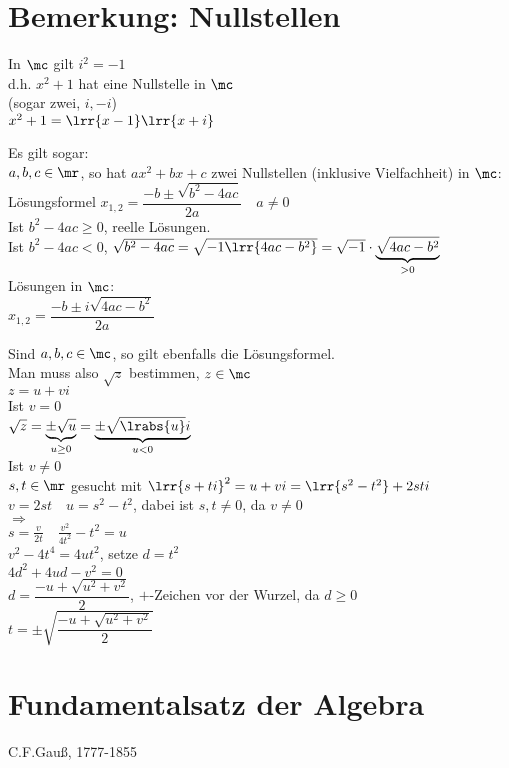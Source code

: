 \section{Bemerkung: Nullstellen}
		\item In $\mc$ gilt $i^2=-1$\\
			d.h. $x^2+1$ hat eine Nullstelle in $\mc$\\
			(sogar zwei, $i,-i$)\\
			$x^2+1=\lrr{x-1}\lrr{x+i}$

			Es gilt sogar:\\
			$a,b,c\in\mr$, so hat $ax^2+bx+c$ zwei Nullstellen (inklusive Vielfachheit) in $\mc$:\\
			Lösungsformel $x_{1,2}=\dfrac{-b\pm\sqrt{b^2-4ac}}{2a}\quad a\neq 0$\\
			Ist $b^2-4ac\geq 0$, reelle Lösungen.\\
			Ist $b^2-4ac <0$, $\sqrt{b^2-4ac}=\sqrt{-1\lrr{4ac-b^2}}=\sqrt{-1}\cdot \underbrace{\sqrt{4ac-b^2}}_{>0}$\\
			Lösungen in $\mc$:\\
			$x_{1,2} =\dfrac{-b\pm i\sqrt{4ac-b^2}}{2a}$
		\item Sind $a,b,c \in \mc$, so gilt ebenfalls die Lösungsformel.\\
			Man muss also $\sqrt{z}$ bestimmen, $z\in\mc$\\
			$z=u+vi$\\
			Ist $v=0$\\
			$\sqrt{z}=\underbrace{\pm\sqrt{u}}_{u\geq 0}=\underbrace{\pm\sqrt{\lrabs{u}}i}_{u<0}$\\
			Ist $v\neq 0$\\
			$s,t\in\mr$ gesucht mit $\lrr{s+ti}^2=u+vi=\lrr{s^2-t^2}+2sti$\\
			$v=2st\quad u=s^2-t^2$, dabei ist $s,t\neq 0$, da $v\neq 0$\\
			$\Rightarrow$\\
			$s=\frac{v}{2t}\quad\frac{v^2}{4t^2}-t^2=u$\\
			$v^2-4t^4=4ut^2$, setze $d=t^2$\\
			$4d^2+4ud-v^2=0$\\
			$d=\dfrac{-u+\sqrt{u^2+v^2}}{2}$, $+$-Zeichen vor der Wurzel, da $d\geq 0$\\
			$t=\pm\sqrt{\dfrac{-u+\sqrt{u^2+v^2}}{2}}$
	\subExEnd

\section{Fundamentalsatz der Algebra}
	C.F.Gauß, 1777-1855

